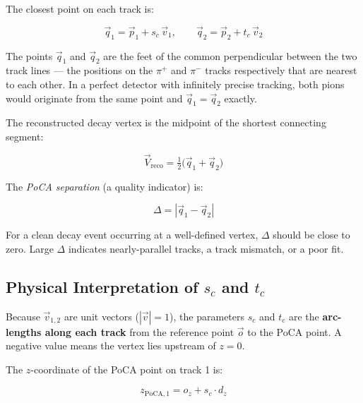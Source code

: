 The closest point on each track is:

\begin{equation}
    \vec{q}_1 = \vec{p}_1 + s_c\,\vec{v}_1, \qquad
    \vec{q}_2 = \vec{p}_2 + t_c\,\vec{v}_2
\end{equation}

\noindent
The points $\vec{q}_1$ and $\vec{q}_2$ are the feet of the common perpendicular between the two track lines --- the positions on the $\pi^+$ and $\pi^-$ tracks respectively that are nearest to each other. In a perfect detector with infinitely precise tracking, both pions would originate from the same point and $\vec{q}_1 = \vec{q}_2$ exactly.

The reconstructed decay vertex is the midpoint of the shortest connecting
segment:

\begin{equation}
    \boxed{\vec{V}_\text{reco} = \tfrac{1}{2}\bigl(\vec{q}_1 + \vec{q}_2\bigr)}
\end{equation}

The \emph{PoCA separation} (a quality indicator) is:

\begin{equation}
    \Delta = |\vec{q}_1 - \vec{q}_2|
\end{equation}

For a clean decay event occurring at a well-defined vertex, $\Delta$ should be
close to zero. Large $\Delta$ indicates nearly-parallel tracks, a track mismatch,
or a poor fit.

\subsection{Physical Interpretation of \texorpdfstring{$s_c$}{sc} and \texorpdfstring{$t_c$}{tc}}

Because $\vec{v}_{1,2}$ are unit vectors ($|\vec{v}| = 1$), the parameters
$s_c$ and $t_c$ are the \textbf{arc-lengths along each track} from the reference
point $\vec{o}$ to the PoCA point. A negative value means the vertex lies
upstream of $z = 0$.

The $z$-coordinate of the PoCA point on track 1 is:

\begin{equation}
    z_{\text{PoCA},1} = o_z + s_c \cdot d_z
\end{equation}

